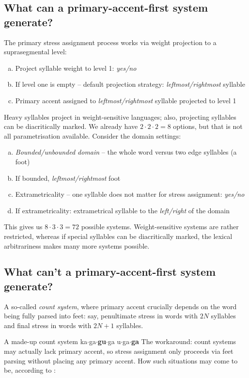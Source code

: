 \documentclass[a4paper, 12pt]{article}
\begin{document}
				\subsection{What can a primary-accent-first system generate?}
				
	The primary stress assignment process works via weight projection to a suprasegmental level:
	
	\begin{enumerate}[a.]
		\item Project syllable weight to level 1: \emph{yes/no} 
		\item If level one is empty -- default projection strategy: \emph{leftmost/rightmost} syllable 
		\item Primary accent assigned to \emph{leftmost/rightmost} syllable projected to level 1 
	\end{enumerate}
	Heavy syllables project in weight-sensitive languages; also, projecting syllables can be diacritically marked. We already have $2 \cdot 2 \cdot 2 = 8$ options, but that is not all parametrisation available. Consider the domain settings:
	
	\begin{enumerate}[a.]
		\item \emph{Bounded/unbounded domain} -- the whole word versus two edge syllables (a foot)
		\item If bounded, \emph{leftmost/rightmost} foot
		\item Extrametricality -- one syllable does not matter for stress assignment: \emph{yes/no}
		\item If extrametricality: extrametrical syllable to the \emph{left/right} of the domain
	\end{enumerate}
	This gives us $8 \cdot 3 \cdot 3 = 72$ possible systems. Weight-sensitive systems are rather restricted, whereas if special syllables can be diacritically marked, the lexical arbitrariness makes many more systems possible.
	
				\subsection{What can't a primary-accent-first system generate?}
				
	A so-called \emph{count system}, where primary accent crucially depends on the word being fully parsed into feet: say, penultimate stress in words with $2N$ syllables and final stress in words with $2N + 1$ syllables.
	
	\pex A made-up count system
		\a ka$\cdot$ga$\cdot$\textbf{gu}$\cdot$ga
		\a u$\cdot$ga$\cdot$\textbf{ga}
	\xe
	The workaround: count systems may actually lack primary accent, so stress assignment only proceeds via feet parsing without placing any primary accent. How such situations may come to be, according to \textcite{vanderhulst1997}:
	
\end{document}
